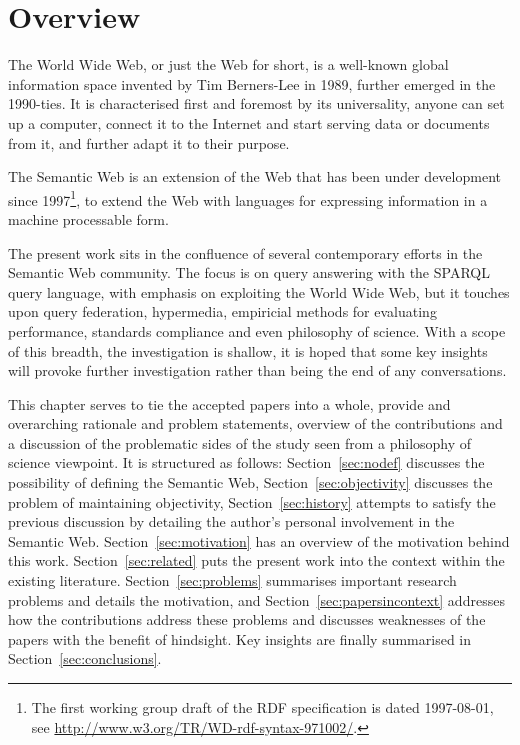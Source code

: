 \section{Overview}\label{sec:introoverview}

The World Wide Web, or just the Web for short, is a well-known global
information space invented by Tim Berners-Lee in 1989, further emerged
in the 1990-ties. It is characterised first and foremost by its
universality, anyone can set up a computer, connect it to the Internet and
start serving data or documents from it, and further adapt it to their purpose. 

The Semantic Web is an extension of the Web that has been under
development since 1997\footnote{The first working group draft of the
  RDF specification is dated 1997-08-01, see
  \url{http://www.w3.org/TR/WD-rdf-syntax-971002/}.}, to extend the
Web with languages for expressing information in a machine processable
form\cite{semwebroadmap}.



The present work sits in the confluence of several contemporary
efforts in the Semantic Web community. The focus is on query answering
with the SPARQL query language, with emphasis on exploiting the World
Wide Web, but it touches upon query federation, hypermedia, empiricial
methods for evaluating performance, standards compliance and even
philosophy of science. With a scope of this breadth, the investigation
is shallow, it is hoped that some key insights will provoke further
investigation rather than being the end of any conversations.

This chapter serves to tie the accepted papers into a whole, provide
and overarching rationale and problem statements, overview of the
contributions and a discussion of the problematic sides of the study
seen from a philosophy of science viewpoint. It is structured as
follows: Section~\ref{sec:nodef} discusses the possibility of defining
the Semantic Web, Section~\ref{sec:objectivity} discusses the problem
of maintaining objectivity, Section~\ref{sec:history} attempts to
satisfy the previous discussion by detailing the author's personal
involvement in the Semantic Web. Section~\ref{sec:motivation} has an
overview of the motivation behind this work.
Section~\ref{sec:related} puts the present work into the context
within the existing literature. Section~\ref{sec:problems} summarises
important research problems and details the motivation, and
Section~\ref{sec:papersincontext} addresses how the contributions
address these problems and discusses weaknesses of the papers with the
benefit of hindsight. Key insights are finally summarised in
Section~\ref{sec:conclusions}.


